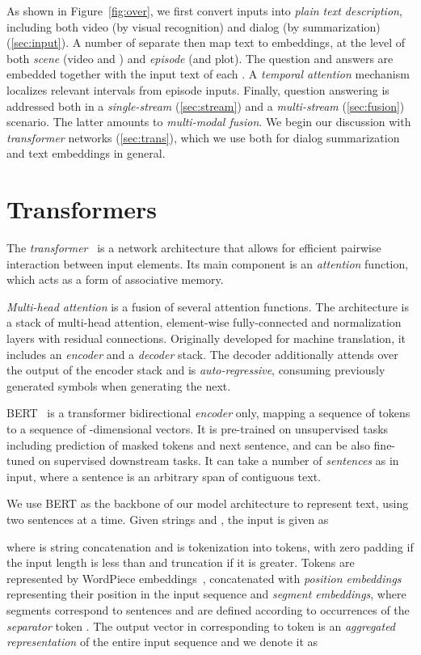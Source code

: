 \documentclass[10pt,twocolumn,letterpaper]{article}
\begin{document}
As shown in Figure~\ref{fig:over}, we first convert inputs into \emph{plain text description}, including both video (by visual recognition) and dialog (by summarization) (\autoref{sec:input}). A number of separate \emph{\branches} then map text to embeddings, at the level of both \emph{scene} (video and \sceneSum) and \emph{episode} (\episodeSum and plot). The question and answers are embedded together with the input text of each \branch. A \emph{temporal attention} mechanism localizes relevant intervals from episode inputs. Finally, question answering is addressed both in a \emph{single-stream} (\autoref{sec:stream}) and a \emph{multi-stream} (\autoref{sec:fusion}) scenario. The latter amounts to \emph{multi-modal fusion}. We begin our discussion with \emph{transformer} networks (\autoref{sec:trans}), which we use both for dialog summarization and text embeddings in general. \section{Transformers}
\label{sec:trans}

The \emph{transformer}~\cite{transformervaswani2017attention} is a network architecture that allows for efficient pairwise interaction between input elements. Its main component is an \emph{attention} function, which acts as a form of associative memory.

\emph{Multi-head attention} is a fusion of several attention functions.
The architecture is a stack of multi-head attention, element-wise fully-connected and normalization layers with residual connections. Originally developed for machine translation, it includes an \emph{encoder} and a \emph{decoder} stack. The decoder additionally attends over the output of the encoder stack and is \emph{auto-regressive}, consuming previously generated symbols when generating the next.

BERT~\cite{devlin-etal-2019-bert} is a transformer bidirectional \emph{encoder} only, mapping a sequence of tokens to a sequence of -dimensional vectors. It is pre-trained on unsupervised tasks including prediction of masked tokens and next sentence, and can be also fine-tuned on supervised downstream tasks. It can take a number of \emph{sentences} as in input, where a sentence is an arbitrary span of contiguous text.

We use BERT as the backbone of our model architecture to represent text, using two sentences at a time. Given strings  and , the input is given as

where  is string concatenation and  is tokenization into  tokens, with zero padding if the input length is less than  and truncation if it is greater. Tokens are represented by WordPiece embeddings~\cite{ScNa12,wu2016google}, concatenated with \emph{position embeddings} representing their position in the input sequence and \emph{segment embeddings}, where segments correspond to sentences and are defined according to occurrences of the \emph{separator} token . The output vector in  corresponding to token  is an \emph{aggregated representation} of the entire input sequence and we denote it as
\end{document}
